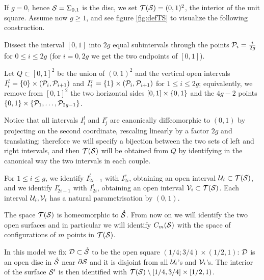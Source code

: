 \begin{defn}
\label{defn:Tsg}
If $g=0$, hence $\S=\Sigma_{0,1}$ is the disc, we set $\T(\S)=(0,1)^2$, the interior of the unit square. Assume
now $g\geq 1$, and see figure \ref{fig:defTS} to visualize the following construction.

Dissect the interval $[0,1]$ into $2g$ equal subintervals through the points $\cP_i=\frac{i}{2g}$ for $0\leq i\leq 2g$
(for $i=0,2g$ we get the two endpoints of $[0,1]$).

Let $Q\subset[0,1]^2$ be the union of $(0,1)^2$ and the vertical open intervals
$I_i^l=\set{0}\times (\cP_i,\cP_{i+1})$ and $I_i^r=\set{1}\times (\cP_i,\cP_{i+1})$ for $1\leq i\leq 2g$;
equivalently, we remove from $[0,1]^2$ the two horizontal sides
$[0,1]\times\set{0,1}$ and the $4g-2$ points $\set{0,1}\times \set{\cP_1,\dots,\cP_{2g-1}}$.

Notice that all intervals $I_i^l$ and $I_j^r$ are
canonically diffeomorphic
to $(0,1)$ by projecting on the second coordinate, rescaling linearly by a factor $2g$
and translating; therefore we will specify a bijection
between the two sets of left and right intervals, and then $\T(\S)$ will be obtained from $Q$
by identifying in the canonical way the two intervals in each couple.

For $1\leq i\leq g$, we identify $I^l_{2i-1}$ with $I^r_{2i}$, obtaining an open interval $\U_i\subset\T(\S)$,
and we identify $I^r_{2i-1}$ with $I^l_{2i}$, obtaining an open interval $\V_i\subset\T(\S)$.
Each interval $\U_i,\V_i$ has a natural parametrisation by $(0,1)$.

The space $\T(\S)$ is homeomorphic to $\mrS$. From now
on we will identify the two open surfaces and in particular we will identify $\cms$ with the
space of configurations of $m$ points in $\T(\S)$.

In this model we fix $\D\subset\mrS$ to be the open square $(1/4;3/4)\times(1/2,1)$:
$\D$ is an open disc in $\mrS$ near $\partial\S$ and 
it is disjoint from all $\U_i$'s and $\V_i$'s. The interior of the surface $\S'$
is then identified with $\T(\S)\setminus [1/4,3/4]\times[1/2,1)$.


\end{defn}


